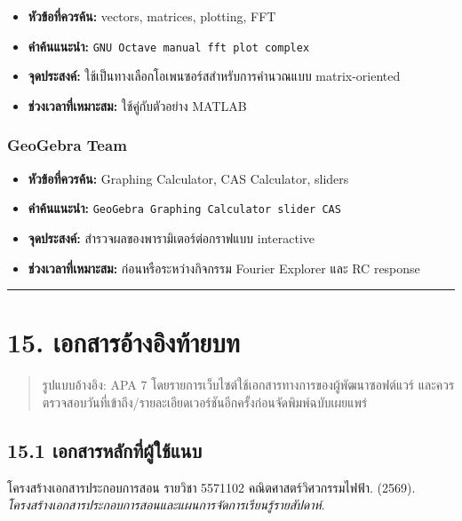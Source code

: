 \begin{itemize}
    \item \textbf{หัวข้อที่ควรค้น:} vectors, matrices, plotting, FFT
    \item \textbf{คำค้นแนะนำ:} \texttt{GNU Octave manual fft plot complex}
    \item \textbf{จุดประสงค์:} ใช้เป็นทางเลือกโอเพนซอร์สสำหรับการคำนวณแบบ matrix-oriented
    \item \textbf{ช่วงเวลาที่เหมาะสม:} ใช้คู่กับตัวอย่าง MATLAB
\end{itemize}

\subsubsection{GeoGebra Team}

\begin{itemize}
    \item \textbf{หัวข้อที่ควรค้น:} Graphing Calculator, CAS Calculator, sliders
    \item \textbf{คำค้นแนะนำ:} \texttt{GeoGebra Graphing Calculator slider CAS}
    \item \textbf{จุดประสงค์:} สำรวจผลของพารามิเตอร์ต่อกราฟแบบ interactive
    \item \textbf{ช่วงเวลาที่เหมาะสม:} ก่อนหรือระหว่างกิจกรรม Fourier Explorer และ RC response
\end{itemize}

\par\noindent\rule{\textwidth}{0.4pt}\par

\section{15. เอกสารอ้างอิงท้ายบท}

\begin{quote}
รูปแบบอ้างอิง: APA 7 โดยรายการเว็บไซต์ใช้เอกสารทางการของผู้พัฒนาซอฟต์แวร์ และควรตรวจสอบวันที่เข้าถึง/รายละเอียดเวอร์ชันอีกครั้งก่อนจัดพิมพ์ฉบับเผยแพร่
\end{quote}

\subsection{15.1 เอกสารหลักที่ผู้ใช้แนบ}

โครงสร้างเอกสารประกอบการสอน รายวิชา 5571102 คณิตศาสตร์วิศวกรรมไฟฟ้า. (2569). \textit{โครงสร้างเอกสารประกอบการสอนและแผนการจัดการเรียนรู้รายสัปดาห์}.

